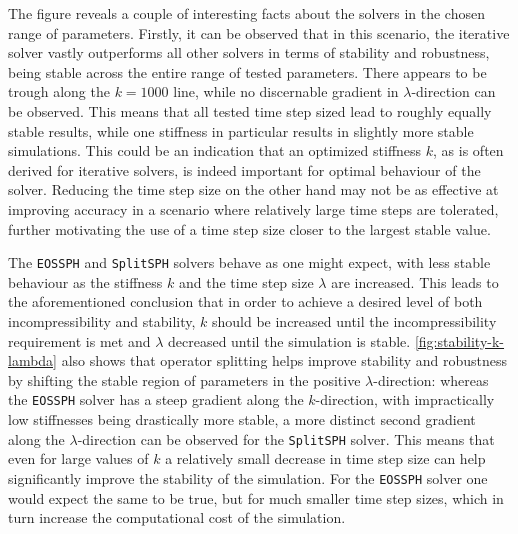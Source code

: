 


The figure reveals a couple of interesting facts about the solvers in the chosen range of parameters. Firstly, it can be observed that in this scenario, the iterative solver vastly outperforms all other solvers in terms of stability and robustness, being stable across the entire range of tested parameters. There appears to be trough along the $k=1000$ line, while no discernable gradient in $\lambda$-direction can be observed. This means that all tested time step sized lead to roughly equally stable results, while one stiffness in particular results in slightly more stable simulations. This could be an indication that an optimized stiffness $k$, as is often derived for iterative solvers, is indeed important for optimal behaviour of the solver. Reducing the time step size on the other hand may not be as effective at improving accuracy in a scenario where relatively large time steps are tolerated, further motivating the use of a time step size closer to the largest stable value.

The \texttt{EOSSPH} and \texttt{SplitSPH} solvers behave as one might expect, with less stable behaviour as the stiffness $k$ and the time step size $\lambda$ are increased. This leads to the aforementioned conclusion that in order to achieve a desired level of both incompressibility and stability, $k$ should be increased until the incompressibility requirement is met and $\lambda$ decreased until the simulation is stable. \autoref{fig:stability-k-lambda} also shows that operator splitting helps improve stability and robustness by shifting the stable region of parameters in the positive $\lambda$-direction: whereas the \texttt{EOSSPH} solver has a steep gradient along the $k$-direction, with impractically low stiffnesses being drastically more stable, a more distinct second gradient along the $\lambda$-direction can be observed for the \texttt{SplitSPH} solver. This means that even for large values of $k$ a relatively small decrease in time step size can help significantly improve the stability of the simulation. For the \texttt{EOSSPH} solver one would expect the same to be true, but for much smaller time step sizes, which in turn increase the computational cost of the simulation.

\horizontalspacer


